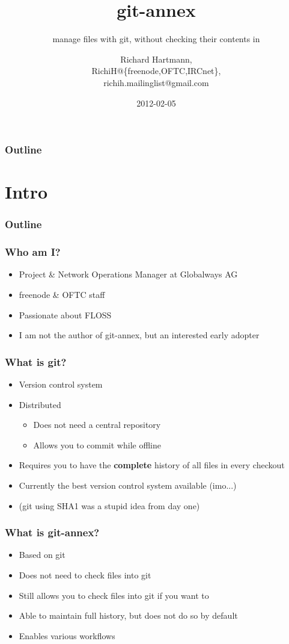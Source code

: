\documentclass[t]{beamer}
\title{git-annex}
\subtitle{manage files with git, without checking their contents in}
\author{Richard Hartmann,\\
RichiH@\{freenode,OFTC,IRCnet\},\\
richih.mailinglist@gmail.com}
\date{2012-02-05}
\begin{document}
\begin{frame}
	\titlepage
\end{frame}

\begin{frame}
	\frametitle{Outline}
	\tableofcontents
\end{frame}


\section{Intro}

\begin{frame}
	\frametitle{Outline}
	\tableofcontents[currentsection]
\end{frame}

\begin{frame}
	\frametitle{Who am I?}
	\begin{itemize}
		\item Project \& Network Operations Manager at Globalways AG
		\item freenode \& OFTC staff
		\item Passionate about FLOSS
		\item I am not the author of git-annex, but an interested early adopter
	\end{itemize}
\end{frame}

\begin{frame}
	\frametitle{What is git?}
	\begin{itemize}
		\item Version control system
		\item Distributed
		\begin{itemize}
			\item Does not need a central repository
			\item Allows you to commit while offline
		\end{itemize}
		\item Requires you to have the \textbf{complete} history of all files in every checkout
		\item Currently the best version control system available (imo...)
		\item (git using SHA1 was a stupid idea from day one)
	\end{itemize}
\end{frame}

\begin{frame}
	\frametitle{What is git-annex?}
	\begin{itemize}
		\item Based on git
		\item Does not need to check files into git
		\item Still allows you to check files into git if you want to
		\item Able to maintain full history, but does not do so by default
		\item Enables various workflows
	\end{itemize}
\end{frame}
\end{document}
